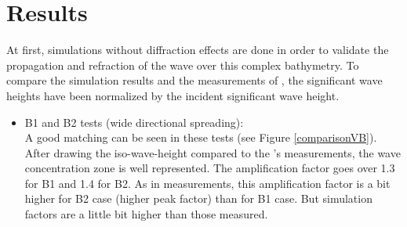 \section{\tomawac Results }
At first, simulations without diffraction effects are done in order to validate
the propagation and refraction of the wave over this complex bathymetry. To
compare the simulation results and the measurements of \cite{Vincent1989}, the
significant wave heights have been normalized by the incident significant wave
height.\\
\begin{itemize}
\item B1 and B2 tests (wide directional spreading):\\
  A good matching can be seen in these tests (see Figure \ref{comparisonVB}).
  After drawing the iso-wave-height compared to the \cite{Vincent1989}'s
  measurements, the wave concentration zone is well represented. The
  amplification factor goes over 1.3 for B1 and 1.4 for B2. As in measurements,
  this amplification factor is a bit higher for B2 case (higher peak factor)
  than for B1 case. But simulation factors are a little bit higher than those
  measured.
  

\end{itemize}
